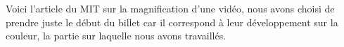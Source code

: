 Voici l'article du MIT sur la magnification d'une vidéo, nous avons choisi
de prendre juste le début du billet car il correspond à leur développement 
sur la couleur, la partie sur laquelle nous avons travaillés.


